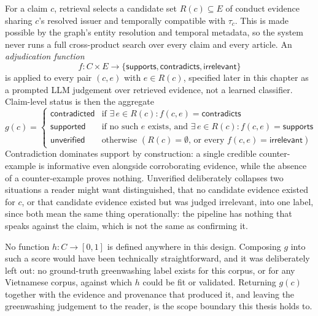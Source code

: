 \documentclass[fontsize=12pt,oneside,headings=small]{scrreprt}
\begin{document}
For a claim $c$, retrieval selects a candidate set $R(c) \subseteq E$ of conduct evidence sharing $c$'s resolved issuer and temporally compatible with $\tau_c$. This is made possible by the graph's entity resolution and temporal metadata, so the system never runs a full cross-product search over every claim and every article. An \emph{adjudication function}
\[
  f : C \times E \rightarrow \{\textsf{supports}, \textsf{contradicts}, \textsf{irrelevant}\}
\]
is applied to every pair $(c, e)$ with $e \in R(c)$, specified later in this chapter as a prompted LLM judgement over retrieved evidence, not a learned classifier. Claim-level status is then the aggregate
\[
  g(c) =
  \begin{cases}
    \textsf{contradicted} & \text{if } \exists\, e \in R(c) : f(c,e) = \textsf{contradicts} \\
    \textsf{supported}    & \text{if no such } e \text{ exists, and } \exists\, e \in R(c) : f(c,e) = \textsf{supports} \\
    \textsf{unverified}   & \text{otherwise } (R(c) = \emptyset\text{, or every } f(c,e) = \textsf{irrelevant})
  \end{cases}
\]
Contradiction dominates support by construction: a single credible counter-example is informative even alongside corroborating evidence, while the absence of a counter-example proves nothing. \textsf{Unverified} deliberately collapses two situations a reader might want distinguished, that no candidate evidence existed for $c$, or that candidate evidence existed but was judged irrelevant, into one label, since both mean the same thing operationally: the pipeline has nothing that speaks against the claim, which is not the same as confirming it.

No function $h : C \rightarrow [0,1]$ is defined anywhere in this design. Composing $g$ into such a score would have been technically straightforward, and it was deliberately left out: no ground-truth greenwashing label exists for this corpus, or for any Vietnamese corpus, against which $h$ could be fit or validated. Returning $g(c)$ together with the evidence and provenance that produced it, and leaving the greenwashing judgement to the reader, is the scope boundary this thesis holds to.
\end{document}
